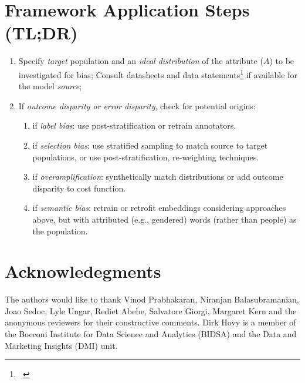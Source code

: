 \documentclass[11pt,a4paper]{article}
\begin{document}
\section*{Framework Application Steps (TL;DR)}
\begin{flushleft}
\begin{enumerate}
\setlength{\itemsep}{0pt}%
\setlength{\parskip}{0pt}
\item Specify \textit{target} population and an \textit{ideal distribution} of the attribute ($A$) to be investigated for bias; 
Consult datasheets and data statements\footnote{~\cite{gebru2018datasheets,bender2018data}} if available for the model \textit{source};
\item If \textit{outcome disparity \textup{or} error disparity}, check for potential origins: 
\begin{enumerate}
 \setlength{\itemsep}{0pt}%
 \setlength{\parskip}{0pt}
 \item if \textit{label bias}: use post-stratification or retrain annotators.
 \item if \textit{selection bias}: use stratified sampling to match source to target populations, or use post-stratification, re-weighting techniques.  
 \item if \textit{overamplification}: synthetically match distributions or add outcome disparity to cost function.
 \item if \textit{semantic bias}: retrain or retrofit embeddings considering approaches above, but with attributed (e.g., gendered) words (rather than people) as the population. 
    \end{enumerate}
 \end{enumerate}
 \end{flushleft}


\section*{Acknowledegments}
The authors would like to thank Vinod Prabhakaran, Niranjan Balasubramanian, Joao Sedoc, Lyle Ungar, Rediet Abebe, Salvatore Giorgi, Margaret Kern and the anonymous reviewers for their constructive comments.
Dirk Hovy is a member of the Bocconi Institute for Data Science and Analytics (BIDSA) and the Data and Marketing Insights (DMI) unit.


 


% 
\end{document}
